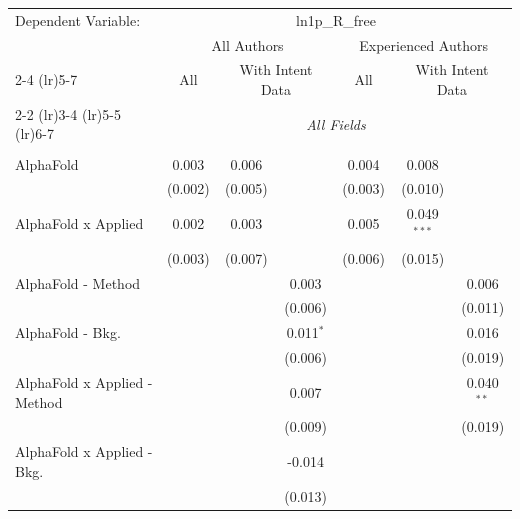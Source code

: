 \begingroup
\centering
\begin{tabular}{lcccccc}
   \tabularnewline \midrule \midrule
   Dependent Variable: & \multicolumn{6}{c}{ln1p\_R\_free}\\
 & \multicolumn{3}{c}{All Authors} & \multicolumn{3}{c}{Experienced Authors} \\
\cmidrule(lr){2-4} \cmidrule(lr){5-7}
 & \multicolumn{1}{c}{All} & \multicolumn{2}{c}{With Intent Data} & \multicolumn{1}{c}{All} & \multicolumn{2}{c}{With Intent Data} \\
\cmidrule(lr){2-2} \cmidrule(lr){3-4} \cmidrule(lr){5-5} \cmidrule(lr){6-7}
 & \multicolumn{6}{c}{\textit{All Fields}} \\ \\
   AlphaFold                      & 0.003       & 0.006        &              & 0.004       & 0.008         &   \\   
                                  & (0.002)     & (0.005)      &              & (0.003)     & (0.010)       &   \\   
   AlphaFold x Applied            & 0.002       & 0.003        &              & 0.005       & 0.049$^{***}$ &   \\   
                                  & (0.003)     & (0.007)      &              & (0.006)     & (0.015)       &   \\   
   AlphaFold - Method             &             &              & 0.003        &             &               & 0.006\\   
                                  &             &              & (0.006)      &             &               & (0.011)\\   
   AlphaFold - Bkg.               &             &              & 0.011$^{*}$  &             &               & 0.016\\   
                                  &             &              & (0.006)      &             &               & (0.019)\\   
   AlphaFold x Applied - Method   &             &              & 0.007        &             &               & 0.040$^{**}$\\   
                                  &             &              & (0.009)      &             &               & (0.019)\\   
   AlphaFold x Applied - Bkg.     &             &              & -0.014       &             &               &   \\   
                                  &             &              & (0.013)      &             &               &   \\   

\end{tabular}
